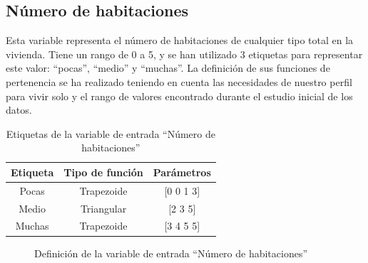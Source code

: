\documentclass[12pt]{report} %
\begin{document}
        \subsection{Número de habitaciones}
        Esta variable representa el número de habitaciones de cualquier tipo total en la vivienda.
        Tiene un rango de 0 a 5, y se han utilizado 3 etiquetas para representar este valor: ``pocas'', ``medio'' y ``muchas''.
        La definición de sus funciones de pertenencia se ha realizado teniendo en cuenta las necesidades de nuestro perfil para vivir solo y el rango de valores encontrado durante el estudio inicial de los datos.

        \begin{table}[h]
            \center
            \begin{tabular}{@{}ccc@{}}
                \toprule
                \textbf{Etiqueta} & \textbf{Tipo de función} & \textbf{Parámetros} \\
                \midrule
                Pocas  & Trapezoide & [0 0 1 3] \\
                Medio  & Triangular & [2 3 5]   \\
                Muchas & Trapezoide & [3 4 5 5] \\
                \bottomrule
            \end{tabular}
            \caption{Etiquetas de la variable de entrada ``Número de habitaciones''}
        \end{table}

        \begin{figure}[H]
            \centering
            \caption{Definición de la variable de entrada ``Número de habitaciones''}
        \end{figure}
\end{document}
